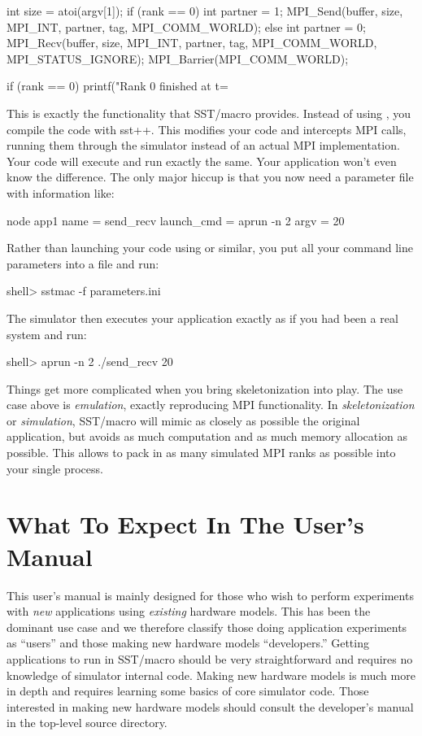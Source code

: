\begin{CppCode}
int size = atoi(argv[1]);
if (rank == 0){
 int partner = 1;
  MPI_Send(buffer, size, MPI_INT, partner, tag, MPI_COMM_WORLD);
} else {
  int partner = 0;
  MPI_Recv(buffer, size, MPI_INT, partner, tag, MPI_COMM_WORLD, MPI_STATUS_IGNORE);
}
MPI_Barrier(MPI_COMM_WORLD);

if (rank == 0){
  printf("Rank 0 finished at t=%
}
\end{CppCode}

This is exactly the functionality that SST/macro provides.
Instead of using , you compile the code with {sst++}.
This modifies your code and intercepts MPI calls, running them through the simulator instead of an actual MPI implementation.
Your code will execute and run exactly the same.
Your application won't even know the difference.
The only major hiccup is that you now need a parameter file with information like:

\begin{ViFile}
node {
 app1 {
  name = send_recv
  launch_cmd = aprun -n 2
  argv = 20
 }
}
\end{ViFile}
Rather than launching your code using  or similar, you put all your command line parameters into a  file and run:

\begin{ShellCmd}
shell> sstmac -f parameters.ini
\end{ShellCmd}
The simulator then executes your application exactly as if you had been a real system and run:

\begin{ShellCmd}
shell> aprun -n 2 ./send_recv 20
\end{ShellCmd}
Things get more complicated when you bring skeletonization into play.
The use case above is \emph{emulation}, exactly reproducing MPI functionality.
In \emph{skeletonization} or \emph{simulation}, SST/macro will mimic as closely as possible the original application,
but avoids as much computation and as much memory allocation as possible.
This allows to pack in as many simulated MPI ranks as possible into your single  process.

\section{What To Expect In The User's Manual}
This user's manual is mainly designed for those who wish to perform experiments with \emph{new} applications using \emph{existing} hardware models.
This has been the dominant use case and we therefore classify those doing application experiments as ``users'' and those making new hardware models ``developers.''
Getting applications to run in SST/macro should be very straightforward and requires no knowledge of simulator internal code.
Making new hardware models is much more in depth and requires learning some basics of core simulator code.
Those interested in making new hardware models should consult the developer's manual in the top-level source directory.
